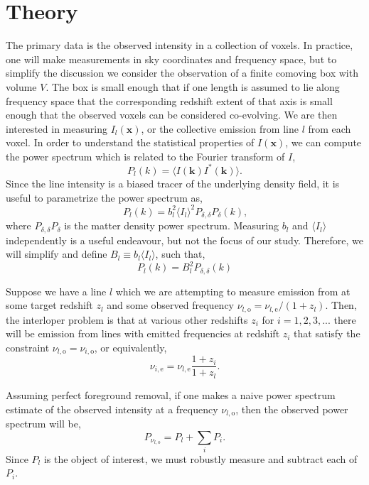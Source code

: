 \documentclass{aastex62}
\newcommand{\beq}{\begin{equation}}
\newcommand{\eeq}{\end{equation}}
\newcommand{\mynu}[2]{\ensuremath{\nu_{#1,\text{#2}}}}
\newcommand{\denps}{\ensuremath{P_{\delta,\delta}}}
\newcommand{\avg}[1]{\ensuremath{\langle #1 \rangle}}
\begin{document}
\section{Theory}\label{sec:theory}
The primary data is the observed intensity in a collection of voxels. In
practice, one will make measurements in sky coordinates and frequency space,
but to simplify the discussion we consider the observation of a finite
comoving box with volume $V$. The box is small enough that if one length is
assumed to lie along frequency space that the corresponding redshift extent of
that axis is small enough that the observed voxels can be considered
co-evolving. We are then interested in measuring $I_{l}(\bm{x})$, or the
collective emission from line $l$ from each voxel. In order to understand the
statistical properties of $I(\bm{x})$, we can compute the power spectrum which
is related to the Fourier transform of $I$,
\beq
P_{l}(k) = \avg{I(\bm{k}) I^{*}(\bm{k})}\text{.}
\eeq
Since the line intensity is a biased tracer of the underlying density field,
it is useful to parametrize the power spectrum as,
\beq
P_l(k) = b_l^2 \avg{I_l}^2 \denps{P_{\delta}}(k)\text{,}
\eeq
where $\denps{P_{\delta}}$ is the matter density power spectrum. Measuring
$b_l$ and $\avg{I_l}$ independently is a useful endeavour, but not the focus
of our study. Therefore, we will simplify and define $B_l \equiv b_l
\avg{I_l}$, such that,
\beq
P_{l}(k) = B_l^2 \denps(k)
\eeq

Suppose we have a line $l$ which we are attempting to measure emission from at
some target redshift $z_l$ and some observed frequency $\mynu{l}{o} =
\mynu{l}{e}/(1+z_l)$. Then, the interloper problem is that at various other
redshifts $z_i$ for $i=1,2,3,...$ there will be emission from lines with
emitted frequencies at redshift $z_i$ that satisfy the constraint $\mynu{l}{o}
= \mynu{i}{o}$, or equivalently,
\beq
\mynu{i}{e} = \mynu{l}{e}\frac{1+z_i}{1+z_l}\text{.}
\eeq

Assuming perfect foreground removal, if one makes a naive power spectrum
estimate of the observed intensity at a frequency $\mynu{l}{o}$, then the
observed power spectrum will be,
\beq\label{eq:observed_with_int}
P_{\mynu{l}{o}} = P_{l} + \sum_{i} P_{i}\text{.}
\eeq
Since $P_l$ is the object of interest, we must robustly measure and subtract
each of $P_i$.
\end{document}

